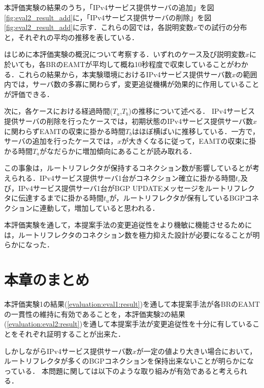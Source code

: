 本評価実験の結果のうち，「IPv4サービス提供サーバの追加」を図\ref{fig:eval2_result_add}に，「IPv4サービス提供サーバの削除」を図\ref{fig:eval2_result_add}に示す．これらの図では，各説明変数$x$での試行の分布と，それぞれの平均の推移を表している．

はじめに本評価実験の概況について考察する．いずれのケース及び説明変数$x$に於いても，各BRのEAMTが平均して概ね10秒程度で収束していることがわかる．これらの結果から，本実験環境におけるIPv4サービス提供サーバ数$x$の範囲内では，サーバ数の多寡に関わらず，変更追従機構が効果的に作用していることが評価できる．


次に，各ケースにおける経過時間($T_a$,$T_b$)の推移について述べる．
IPv4サービス提供サーバの削除を行ったケースでは，初期状態のIPv4サービス提供サーバ数$x$に関わらずEAMTの収束に掛かる時間$T_b$はほぼ横ばいに推移している．一方で，サーバの追加を行ったケースでは，$x$が大きくなるに従って，EAMTの収束に掛かる時間$T_a$がなだらかに増加傾向にあることが読み取れる．

この事象は，ルートリフレクタが保持するコネクション数が影響しているとが考えられる．IPv4サービス提供サーバ1台がコネクション確立に掛かる時間$t_c$及び，IPv4サービス提供サーバ1台がBGP UPDATEメッセージをルートリフレクタに伝達するまでに掛かる時間$t_u$が，ルートリフレクタが保有しているBGPコネクションに連動して，増加していると思われる．


本評価実験を通して，本提案手法の変更追従性をより機敏に機能させるためには，ルートリフレクタのコネクション数を極力抑えた設計が必要になることが明らかになった．



\newpage
\section{本章のまとめ}
\label{evaluation:consideration}
本評価実験1の結果(\ref{evaluation:eval1:result})を通して本提案手法が各BRのEAMTの一貫性の維持に有効であることを，本評価実験2の結果(\ref{evaluation:eval2:result})を通して本提案手法が変更追従性を十分に有していることをそれぞれ証明することが出来た．

しかしながらIPv4サービス提供サーバ数$x$が一定の値より大きい場合において，ルートリフレクタが多くのBGPコネクションを保持出来ないことが明らかになっている．
本問題に関しては以下のような取り組みが有効であると考えられる．

